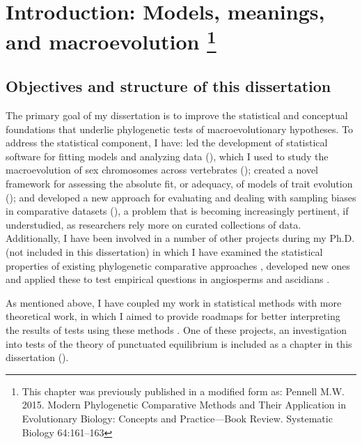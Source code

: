 \chapter[Introduction: Models, meanings, and macroevolution]{Introduction: Models, meanings, and macroevolution \footnote {This chapter was previously published in a modified form as: Pennell M.W. 2015. Modern Phylogenetic Comparative Methods and Their Application in Evolutionary Biology: Concepts and Practice---Book Review. Systematic Biology 64:161--163}}
\label{chap:introduction}

\section{Objectives and structure of this dissertation}

The primary goal of my dissertation is to improve the statistical and conceptual foundations that underlie phylogenetic tests of macroevolutionary hypotheses. To address the statistical component, I have: led the development of statistical software for fitting models and analyzing data (), which I used to study the macroevolution of sex chromosomes across vertebrates (); created a novel framework for assessing the  absolute fit, or adequacy, of models of trait evolution (); and developed a new approach for evaluating and dealing with sampling biases in comparative datasets (), a problem that is becoming increasingly pertinent, if understudied, as researchers rely more on curated collections of data. Additionally, I have been involved in a number of other projects during my Ph.D. (not included in this dissertation) in which I have examined the statistical properties of existing phylogenetic comparative approaches \citep{Pennell2012, UyedaPCA, Sarverprior}, developed new ones \citep{SlaterPennell, ksi} and applied these to test empirical questions in angiosperms \citep{ksi, nestedradiations} and ascidians \citep{Maliska2013}.

As mentioned above, I have coupled my work in statistical methods with more theoretical work, in which I aimed to provide roadmaps for better interpreting the results of tests using these methods \citep{Rosenblum2012, PennellHarmon, PennellPE, PennellTREEresponse, Pennellpcmbook}. One of these projects, an investigation into tests of the theory of punctuated equilibrium \citep{Eldredge1971, EldredgeGould1972} is included as a chapter in this dissertation (). 

